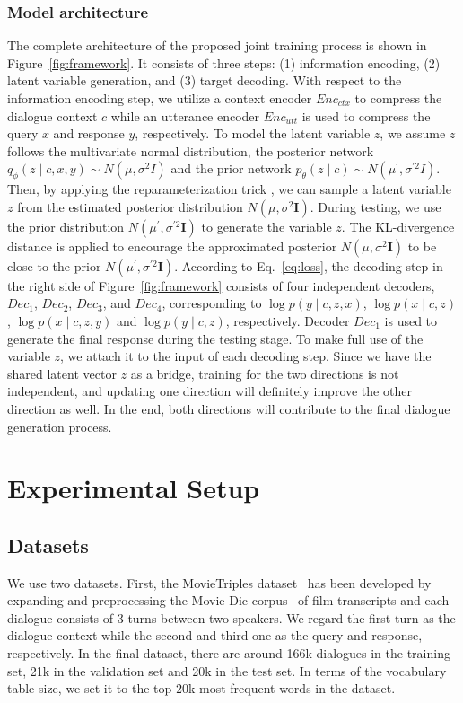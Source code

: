 \documentclass[sigconf]{acmart}
\begin{document}
\subsubsection{Model architecture} The complete architecture of the proposed joint training process is shown in Figure~\ref{fig:framework}. 
It consists of three steps: (1) information encoding, (2) latent variable generation, and (3) target decoding. 
With respect to the information encoding step, we utilize a context encoder $Enc_{ctx}$ to compress the dialogue context $c$ while an utterance encoder $Enc_{utt}$ is used to compress the query $x$ and response $y$, respectively.
To model the latent variable $z$, we assume $z$ follows the multivariate normal distribution, the posterior network $q_\phi(z\mid c, x, y) \sim N(\mu, \sigma^2 I)$ and the prior network $p_\theta(z \mid c) \sim N(\mu^\prime, \sigma^{\prime2} I)$. Then, by applying the reparameterization trick \citep{kingma2013auto}, we can sample a latent variable $z$ from the estimated posterior distribution $N(\mu, \sigma^2 \bm{I})$. During testing, we use the prior distribution $N(\mu^\prime, \sigma^{\prime2} \bm{I})$ to generate the variable $z$. The KL-divergence distance is applied to encourage the approximated posterior $N(\mu, \sigma^2 \bm{I})$ to be close to the prior $N(\mu^\prime, \sigma^{\prime2} \bm{I})$. 
According to Eq.~\ref{eq:loss}, the decoding step in the right side of Figure~\ref{fig:framework} consists of four independent decoders, $Dec_1$, $Dec_2$, $Dec_3$, and $Dec_4$, corresponding to $\log p(y\mid c,z,x)$, $\log p(x\mid c,z)$, $\log p(x\mid c,z,y)$ and $\log p(y\mid c,z)$, respectively. Decoder $Dec_1$ is used to generate the final response during the testing stage. To make full use of the variable $z$, we attach it to the input of each decoding step. Since we have the shared latent vector $z$ as a bridge, training for the two directions is not independent, and updating one direction will definitely improve the other direction as well. In the end, both directions will contribute to the final dialogue generation process.


\section{Experimental Setup}
\label{sec:experiments}
\subsection{Datasets}
We use two datasets.
First, the MovieTriples dataset~\citep{serban2016hred} has been developed by expanding and preprocessing the Movie-Dic corpus~\citep{banchs2012movie} of film transcripts and each dialogue consists of 3 turns between two speakers. We regard the first turn as the dialogue context while the second and third one as the query and response, respectively. In the final dataset, there are around 166k dialogues in the training set, 21k in the validation set and 20k in the test set. In terms of the vocabulary table size, we set it to the top 20k most frequent words in the dataset.
\end{document}
